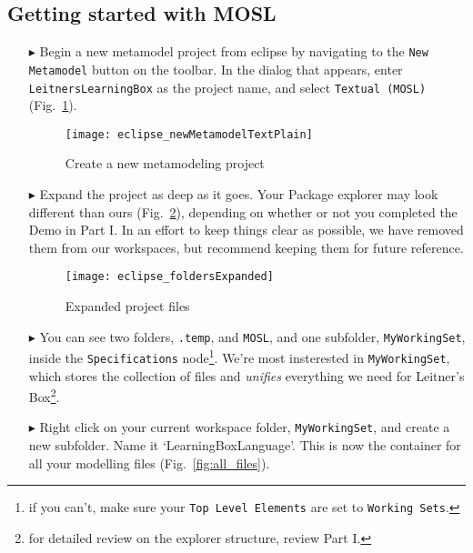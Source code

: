 \clearpage
\subsection{Getting started with MOSL}
\texHeader
\hypertarget{static:starting tex}{}

\begin{itemize}

\item[$\blacktriangleright$] \hypertarget{static tex}{Begin a} new metamodel project from eclipse by navigating to the \texttt{New Metamodel} button on the
toolbar. In the dialog that appears, enter \texttt{LeitnersLearningBox} as the project name, and select \texttt{Textual (MOSL)}  (Fig.~\ref{fig:new_project}).

\begin{figure}[htbp]
	\centering
  \texttt{[image: eclipse\_newMetamodelTextPlain]}
	\caption{Create a new metamodeling project}
	\label{fig:new_project}
\end{figure}

\item[$\blacktriangleright$] Expand the project as deep as it goes. Your Package explorer may look different than ours (Fig.~\ref{fig:expanded_folders}),
depending on whether or not you completed the Demo in Part I. In an effort to keep things clear as possible, we have removed them from our workspaces, but
recommend keeping them for future reference.

\begin{figure}[htbp]
	\centering
  \texttt{[image: eclipse\_foldersExpanded]}
	\caption{Expanded project files}
	\label{fig:expanded_folders}
\end{figure} 

\clearpage
\item[$\blacktriangleright$] You can see two folders, \texttt{.temp}, and \texttt{MOSL}, and one subfolder, \texttt{MyWorkingSet}, inside the
\texttt{Specifications} node\footnote{if you can't, make sure your \texttt{Top Level Elements} are set to \texttt{Working Sets}.}. We're most insterested in
\texttt{MyWorkingSet}, which stores the collection of files and  \emph{unifies} everything we need for Leitner's Box\footnote{for detailed review on the
explorer structure, review Part I.}.

\vspace{0.5cm}

\item[$\blacktriangleright$] Right click on your current workspace folder, \texttt{MyWorkingSet}, and create a new subfolder. Name it
`LearningBoxLanguage'. This is now the container for all your modelling files (Fig.~\ref{fig:all_files}).


\end{itemize}
